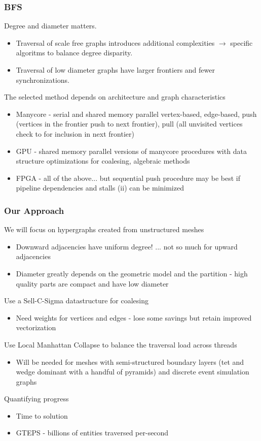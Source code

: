 \documentclass{beamer}
\begin{document}
\begin{frame}
  \frametitle{BFS}
  Degree and diameter matters.
  \begin{itemize}
    \item Traversal of scale free graphs introduces additional
      complexities $\rightarrow$ specific algoritms to balance degree disparity.
    \item Traversal of low diameter graphs have larger frontiers and fewer
      synchronizations.
  \end{itemize}
  The selected method depends on architecture and graph characteristics
  \begin{itemize}
    \item Manycore - serial and shared memory parallel vertex-based, edge-based, push (vertices
      in the frontier push to next frontier), pull (all unvisited vertices check
      to for inclusion in next frontier)
    \item GPU - shared memory parallel versions of manycore procedures with data structure
      optimizations for coalesing, algebraic methods
    \item FPGA - all of the above... but sequential push procedure may be best if
      pipeline dependencies and stalls (ii) can be minimized
  \end{itemize}
\end{frame}

\begin{frame}
  \frametitle{Our Approach}
  We will focus on hypergraphs created from unstructured meshes
  \begin{itemize}
    \item Downward adjacencies have uniform degree! ... not so much for upward
      adjacencies
    \item Diameter greatly depends on the geometric model and the
      partition - high quality parts are compact and have low diameter
  \end{itemize}
  Use a Sell-C-Sigma datastructure for coalesing 
  \begin{itemize}
    \item Need weights for vertices and edges - lose some savings but retain
      improved vectorization
  \end{itemize}
  Use Local Manhattan Collapse to balance the traversal load across threads
  \begin{itemize}
    \item Will be needed for meshes with semi-structured boundary layers (tet
      and wedge dominant with a handful of pyramids) and discrete event
      simulation graphs
  \end{itemize}
  Quantifying progress
  \begin{itemize}
    \item Time to solution
    \item GTEPS - billions of entities traversed per-second
  \end{itemize}
\end{frame}
\end{document}

